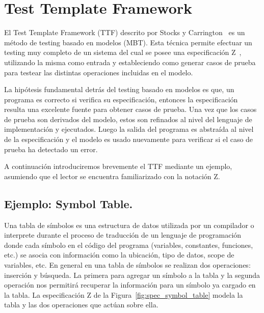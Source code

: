 \chapter{Test Template Framework}

El Test Template Framework (TTF) descrito por Stocks y Carrington~\cite{stocks} es un método de testing basado en modelos (MBT). Esta técnica permite efectuar un testing muy completo de un sistema del cual se posee una especificación Z~\cite{spivey}, utilizando la misma como entrada y estableciendo como generar casos de prueba para testear las distintas operaciones incluidas en el modelo.

La hipótesis fundamental detrás del testing basado en modelos es que, un programa es correcto si verifica su especificación, entonces la especificación resulta una excelente fuente para obtener casos de prueba. Una vez que los casos de prueba son derivados del modelo, estos son refinados al nivel del lenguaje de implementación y ejecutados. Luego la salida del programa es abstraída al nivel de la especificación y el modelo es usado nuevamente para verificar si el caso de prueba ha detectado un error. 


A continuación introduciremos brevemente el TTF mediante un ejemplo, asumiendo que el lector se encuentra familiarizado con la notación Z.

\section{Ejemplo: Symbol Table.}

Una tabla de símbolos es una estructura de datos utilizada por un compilador o interprete durante el proceso de traducción de un lenguaje de programación donde cada símbolo en el código del programa (variables, constantes, funciones, etc.) se asocia con información como la ubicación, tipo de datos, scope de variables, etc. 
En general en una tabla de símbolos se realizan dos operaciones: inserción y búsqueda. La primera para agregar un símbolo a la tabla y la segunda operación nos permitirá recuperar la información para un símbolo ya cargado en la tabla.
La especificación Z de la Figura~\ref{fig:spec_symbol_table} modela la tabla y las dos operaciones que actúan sobre ella.

